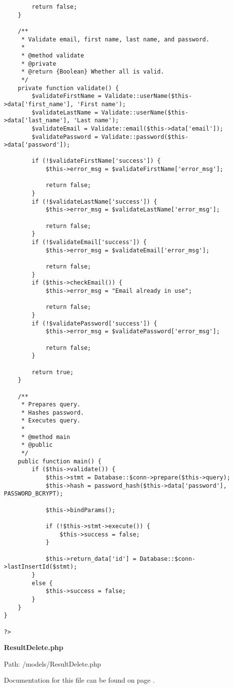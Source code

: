 {\begin{lstlisting}
		return false;
	}

	/**
	 * Validate email, first name, last name, and password.
	 *
	 * @method validate
	 * @private
	 * @return {Boolean} Whether all is valid.
	 */
	private function validate() {
		$validateFirstName = Validate::userName($this->data['first_name'], 'First name');
		$validateLastName = Validate::userName($this->data['last_name'], 'Last name');
		$validateEmail = Validate::email($this->data['email']);
		$validatePassword = Validate::password($this->data['password']);

		if (!$validateFirstName['success']) {
			$this->error_msg = $validateFirstName['error_msg'];

			return false;
		}
		if (!$validateLastName['success']) {
			$this->error_msg = $validateLastName['error_msg'];

			return false;
		}
		if (!$validateEmail['success']) {
			$this->error_msg = $validateEmail['error_msg'];

			return false;
		}
		if ($this->checkEmail()) {
			$this->error_msg = "Email already in use";

			return false;
		}
		if (!$validatePassword['success']) {
			$this->error_msg = $validatePassword['error_msg'];

			return false;
		}

		return true;
	}

	/**
	 * Prepares query.
	 * Hashes password.
	 * Executes query.
	 *
	 * @method main
	 * @public
	 */
	public function main() {
		if ($this->validate()) {
			$this->stmt = Database::$conn->prepare($this->query);
			$this->hash = password_hash($this->data['password'], PASSWORD_BCRYPT);

			$this->bindParams();

			if (!$this->stmt->execute()) {
				$this->success = false;
			}

			$this->return_data['id'] = Database::$conn->lastInsertId($stmt);
		}
		else {
			$this->success = false;
		}
	}
}

?>\end{lstlisting}
}
\textbf{ResultDelete.php}\label{ResultDelete.php}

Path: /models/ResultDelete.php

Documentation for this file can be found on page \pageref{ResultDelete.php.doc}.

